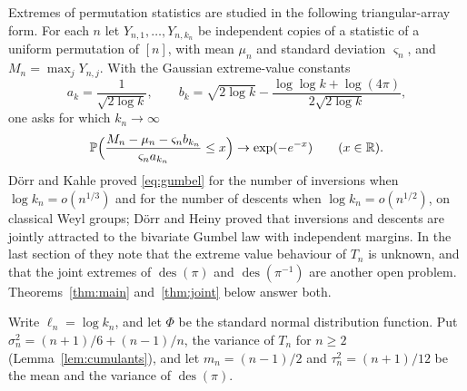 \documentclass[11pt]{amsart}
\theoremstyle{remark}
\newcommand{\des}{\operatorname{des}}
\renewcommand{\P}{\mathbb{P}}
\newcommand{\R}{\mathbb{R}}
\begin{document}
Extremes of permutation statistics are studied in the following triangular-array form. For each $n$ let $Y_{n,1},\dots,Y_{n,k_n}$ be independent copies of a statistic of a uniform permutation of $[n]$, with mean $\mu_n$ and standard deviation $\varsigma_n$, and $M_n=\max_jY_{n,j}$. With the Gaussian extreme-value constants
\begin{equation}\label{eq:ab}
a_k=\frac1{\sqrt{2\log k}},\qquad b_k=\sqrt{2\log k}-\frac{\log\log k+\log(4\pi)}{2\sqrt{2\log k}},
\end{equation}
one asks for which $k_n\to\infty$
\begin{equation}\label{eq:gumbel}
\P\Bigl(\frac{M_n-\mu_n-\varsigma_nb_{k_n}}{\varsigma_na_{k_n}}\le x\Bigr)\to\exp(-e^{-x})\qquad(x\in\R).
\end{equation}
D\"orr and Kahle \cite[Theorem~13]{DK24} proved \eqref{eq:gumbel} for the number of inversions when $\log k_n=o(n^{1/3})$ and for the number of descents when $\log k_n=o(n^{1/2})$, on classical Weyl groups; D\"orr and Heiny \cite{DH25} proved that inversions and descents are jointly attracted to the bivariate Gumbel law with independent margins. In the last section of \cite{DH25} they note that the extreme value behaviour of $T_n$ is unknown, and that the joint extremes of $\des(\pi)$ and $\des(\pi^{-1})$ are another open problem. Theorems~\ref{thm:main} and~\ref{thm:joint} below answer both.

Write $\ell_n=\log k_n$, and let $\Phi$ be the standard normal distribution function. Put $\sigma_n^2=(n+1)/6+(n-1)/n$, the variance of $T_n$ for $n\ge2$ (Lemma~\ref{lem:cumulants}), and let $m_n=(n-1)/2$ and $\tau_n^2=(n+1)/12$ be the mean and the variance of $\des(\pi)$.
\end{document}
